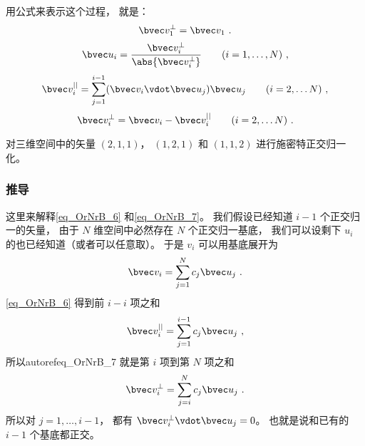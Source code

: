 用公式来表示这个过程， 就是：
\begin{equation}
\bvec v_1^\bot = \bvec v_1~.
\end{equation}
\begin{equation}
\bvec u_i = \frac{\bvec v_i^\bot}{\abs{\bvec v_i^\bot}} \qquad (i = 1, \dots ,N)~,
\end{equation}
\begin{equation}\label{eq_OrNrB_6}
\bvec v_i^{||} = \sum _{j=1}^{i-1} (\bvec v_i \vdot \bvec u_j) \bvec u_j \qquad (i = 2, \dots N)~,
\end{equation}
\begin{equation}\label{eq_OrNrB_7}
\bvec v_i^\bot = \bvec v_i - \bvec v_i^{||} \qquad (i = 2, \dots N)~.
\end{equation}

\begin{exercise}{}
对三维空间中的矢量 $(2, 1, 1)$， $(1, 2, 1)$ 和 $(1, 1, 2)$ 进行施密特正交归一化。
\end{exercise}

\subsubsection{推导}
这里来解释\autoref{eq_OrNrB_6} 和\autoref{eq_OrNrB_7}。 我们假设已经知道 $i-1$ 个正交归一的矢量， 由于 $N$ 维空间中必然存在 $N$ 个正交归一基底， 我们可以设剩下 $u_i$ 的也已经知道（或者可以任意取）。 于是 $v_i$ 可以用基底展开为
\begin{equation}
\bvec v_i = \sum _{j=1}^N c_j \bvec u_j~.
\end{equation}
\autoref{eq_OrNrB_6} 得到前 $i-i$ 项之和
\begin{equation}
\bvec v_i^{||} = \sum _{j=1}^{i-1} c_j\bvec u_j~,
\end{equation}
所以autoref{eq_OrNrB_7} 就是第 $i$ 项到第 $N$ 项之和
\begin{equation}
\bvec v_i^\bot = \sum _{j=i}^{N} c_j\bvec u_j~.
\end{equation}
所以对 $j = 1, \dots , i-1$， 都有 $\bvec v_i^\bot \vdot \bvec u_j = 0$。 也就是说和已有的 $i-1$ 个基底都正交。